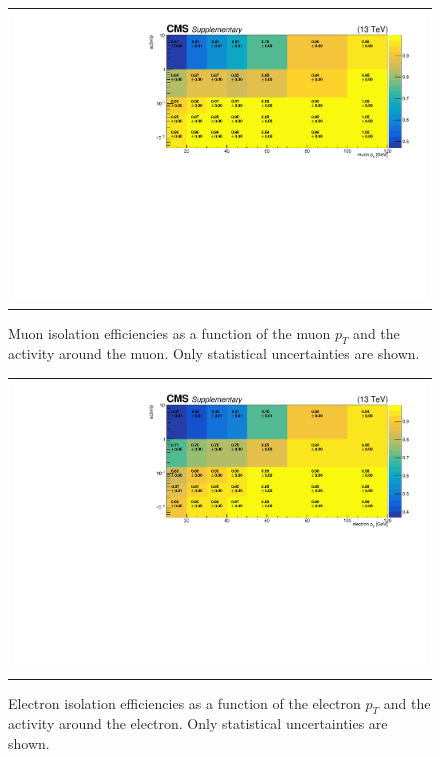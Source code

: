 \begin{figure}[hptb]
\begin{center}
\begin{tabular}{c}
\includegraphics[width=1.0\textwidth]{sections/mc4/Backgrounds/LostLepton/figures/v3_2d_effs_mus_iso_no_baseline.pdf}
\end{tabular}
\end{center}
\caption{Muon isolation efficiencies as a function of the muon $p_T$ and the activity around the muon. Only statistical uncertainties are shown.}
\label{fig:muoneffiso}
\end{figure}

\begin{figure}[hptb]
\begin{center}
\begin{tabular}{c}
\includegraphics[width=1.0\textwidth]{sections/mc4/Backgrounds/LostLepton/figures/v3_2d_effs_els_iso_no_baseline.pdf}
\end{tabular}
\end{center}
\caption{Electron isolation efficiencies as a function of the electron $p_T$ and the activity around the electron. Only statistical uncertainties are shown.}
\label{fig:eleeffiso}
\end{figure}


